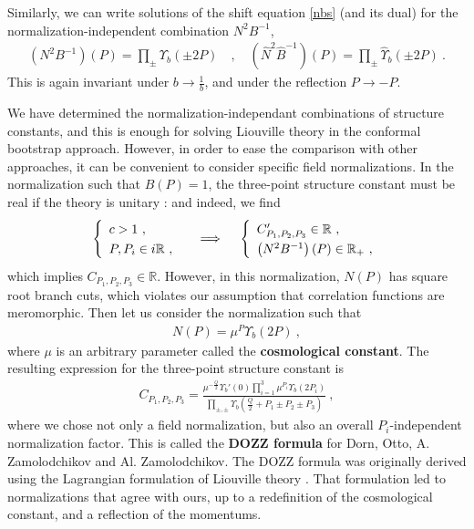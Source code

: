 \documentclass[12pt, a4paper, notitlepage, twoside]{report}
\numberwithin{equation}{section}
\theoremstyle{break}
\begin{document}
Similarly, we can write solutions of the shift equation \eqref{nbs} (and its dual) for the normalization-independent combination $N^2B^{-1}$,
\begin{align}
 \boxed{\left(N^2B^{-1}\right)(P) =\prod_\pm \Upsilon_b(\pm 2P)} \quad , \quad \boxed{\left(\hat N^2\hat B^{-1}\right)(P) = \prod_\pm \hat\Upsilon_b(\pm 2P) } \ .
\end{align}
This is again invariant under $b\to \frac{1}{b}$, and under the reflection $P\to -P$.

We have determined the normalization-independant combinations of structure constants, and this is enough for solving Liouville theory in the conformal bootstrap approach. However, in order to ease the comparison with other approaches, it can be convenient to consider specific field normalizations. 
In the normalization such that $B(P)=1$, the three-point structure constant must be real if the theory is unitary \cite{rib14b}: and indeed, we find
\begin{align}
\renewcommand{\arraystretch}{1.3}
 \left\{\begin{array}{l} c > 1\ , \\ P,P_i\in i\mathbb{R}\ , \end{array}\right. \quad \implies \quad \left\{\begin{array}{l} C'_{P_1,P_2,P_3}\in\mathbb{R}\ , \\ \left(N^2B^{-1}\right)(P)\in \mathbb{R}_+\ , \end{array}\right.
\end{align}
which implies $C_{P_1,P_2,P_3}\in \mathbb{R}$. However, in this normalization, $N(P)$ has square root branch cuts, which violates our assumption that correlation functions are meromorphic. Then let us  consider the normalization such that 
\begin{align}
 N(P) = \mu^{P}\Upsilon_b(2P)\ ,
 \label{nop}
\end{align}
where $\mu$ is an arbitrary parameter called the \textbf{\boldmath cosmological constant}.
The resulting expression for the three-point structure constant is
\begin{align}
 C_{P_1,P_2,P_3} =  \frac{\mu^{-\frac{Q}{2}}\Upsilon_b'(0)\prod_{i=1}^3 \mu^{P_i}\Upsilon_b(2P_i) }{\prod_{\pm,\pm} \Upsilon_b\left(\tfrac{Q}{2}+P_1\pm P_2 \pm P_3\right)} \ ,
\label{caaa}
\end{align}
where we chose not only a field normalization, but also an overall $P_i$-independent normalization factor. 
This is called the \textbf{\boldmath DOZZ formula} for Dorn, Otto, A.
Zamolodchikov and Al. Zamolodchikov. 
The DOZZ formula was originally derived using the Lagrangian formulation of Liouville theory \cite{zz95}. 
That formulation led to normalizations that agree with ours, 
up to a redefinition of the cosmological constant, and a reflection of the momentums. 
\end{document}
